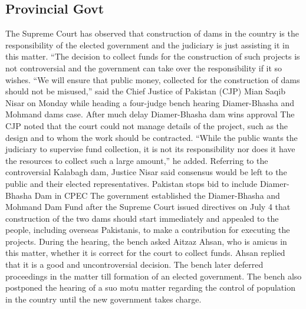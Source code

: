 \documentclass[11pt, journal,letterpaper,compsoc]{IEEEtran}
\begin{document}
\subsection{Provincial Govt}
The Supreme Court has observed that construction of dams in the country is the responsibility of the elected government and the judiciary is just assisting it in this matter.
“The decision to collect funds for the construction of such projects is not controversial and the government can take over the responsibility if it so wishes.
“We will ensure that public money, collected for the construction of dams should not be misused,” said the Chief Justice of Pakistan (CJP) Mian Saqib Nisar on Monday while heading a four-judge bench hearing Diamer-Bhasha and Mohmand dams case.
After much delay Diamer-Bhasha dam wins approval
The CJP noted that the court could not manage details of the project, such as the design and to whom the work should be contracted.  “While the public wants the judiciary to supervise fund collection, it is not its responsibility nor does it have the resources to collect such a large amount,” he added.
Referring to the controversial Kalabagh dam, Justice Nisar said consensus would be left to the public and their elected representatives.
Pakistan stops bid to include Diamer-Bhasha Dam in CPEC
The government established the Diamer-Bhasha and Mohmand Dam Fund after the Supreme Court issued directives on July 4 that construction of the two dams should start immediately and appealed to the people, including overseas Pakistanis, to make a contribution for executing the projects.
During the hearing, the bench asked Aitzaz Ahsan, who is amicus in this matter, whether it is correct for the court to collect funds. Ahsan replied that it is a good and uncontroversial decision.
The bench later deferred proceedings in the matter till formation of an elected government. The bench also postponed the hearing of a suo motu matter regarding the control of population in the country until the new government takes charge.
\end{document}
